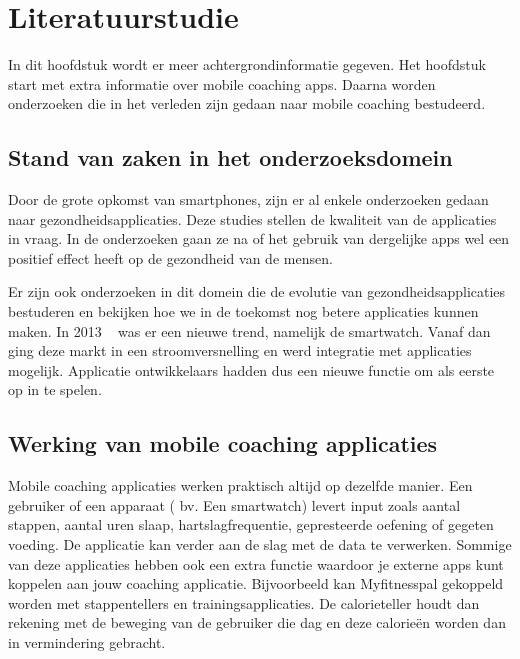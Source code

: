 \chapter{Literatuurstudie}
\label{ch:literatuurstudie}



In dit hoofdstuk wordt er meer achtergrondinformatie gegeven. Het hoofdstuk start met extra informatie over mobile coaching apps. Daarna worden onderzoeken die in het verleden zijn gedaan naar mobile coaching bestudeerd. 

\section{Stand van zaken in het onderzoeksdomein}
\label{sec:stand-van-zaken}

Door de grote opkomst van smartphones, zijn er al enkele onderzoeken gedaan naar gezondheidsapplicaties. Deze studies stellen de kwaliteit van de applicaties in vraag. In de onderzoeken gaan ze na of het gebruik van dergelijke apps wel een positief effect heeft op de gezondheid van de mensen. 

Er zijn ook onderzoeken in dit domein die de evolutie van gezondheidsapplicaties bestuderen en bekijken hoe we in de toekomst nog betere applicaties kunnen maken. In 2013 ~\autocite{Wikipedia2013} was er een nieuwe trend, namelijk de smartwatch. Vanaf dan ging deze markt in een stroomversnelling en werd integratie met applicaties mogelijk. Applicatie ontwikkelaars hadden dus een nieuwe functie om als eerste op in te spelen. 
\newpage

\section{Werking van mobile coaching applicaties}
\label{sec:werking}

Mobile coaching applicaties werken praktisch altijd op dezelfde manier. Een gebruiker of een apparaat ( bv. Een smartwatch) levert input  zoals aantal stappen, aantal uren slaap, hartslagfrequentie, gepresteerde oefening of gegeten voeding. De applicatie kan verder aan de slag met de data te verwerken. Sommige van deze applicaties hebben ook een extra functie waardoor je externe apps kunt koppelen aan jouw coaching applicatie. Bijvoorbeeld kan Myfitnesspal gekoppeld worden met stappentellers en trainingsapplicaties. De calorieteller houdt dan rekening met de beweging van de gebruiker die dag en deze calorieën worden dan in vermindering gebracht. 

